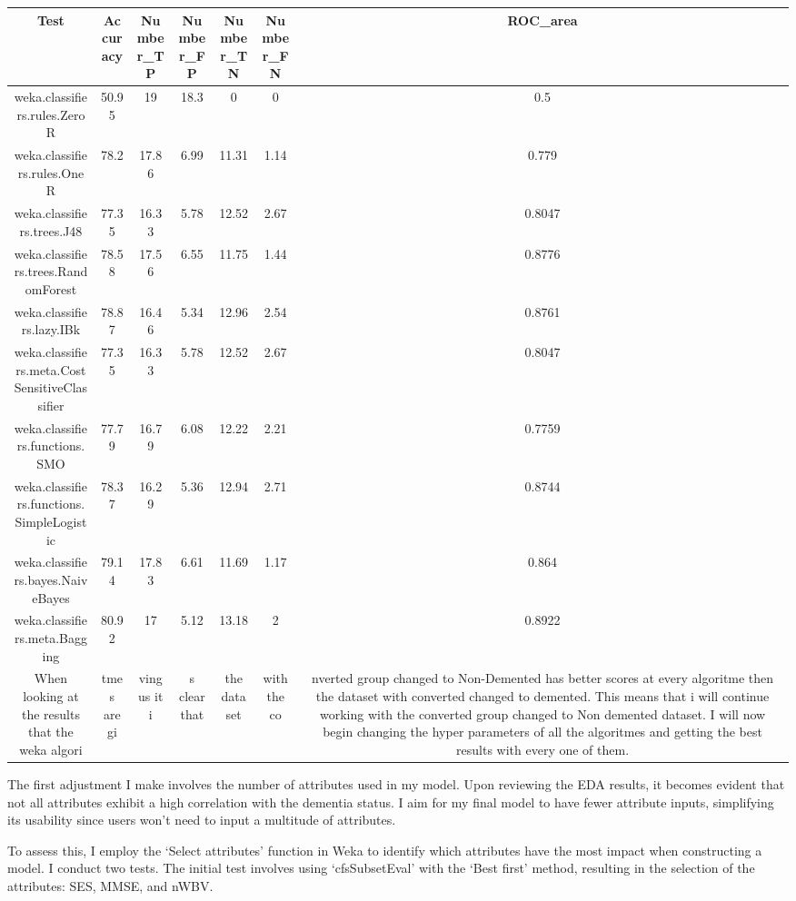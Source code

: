 \documentclass[
]{article}
\begin{document}
\begin{longtable}[]{@{}ccccccc@{}}
\toprule()
Test & Accuracy & Number\_TP & Number\_FP & Number\_TN & Number\_FN &
ROC\_area \\
\midrule()
\endhead
weka.classifiers.rules.ZeroR & 50.95 & 19 & 18.3 & 0 & 0 & 0.5 \\
weka.classifiers.rules.OneR & 78.2 & 17.86 & 6.99 & 11.31 & 1.14 &
0.779 \\
weka.classifiers.trees.J48 & 77.35 & 16.33 & 5.78 & 12.52 & 2.67 &
0.8047 \\
weka.classifiers.trees.RandomForest & 78.58 & 17.56 & 6.55 & 11.75 &
1.44 & 0.8776 \\
weka.classifiers.lazy.IBk & 78.87 & 16.46 & 5.34 & 12.96 & 2.54 &
0.8761 \\
weka.classifiers.meta.CostSensitiveClassifier & 77.35 & 16.33 & 5.78 &
12.52 & 2.67 & 0.8047 \\
weka.classifiers.functions.SMO & 77.79 & 16.79 & 6.08 & 12.22 & 2.21 &
0.7759 \\
weka.classifiers.functions.SimpleLogistic & 78.37 & 16.29 & 5.36 & 12.94
& 2.71 & 0.8744 \\
weka.classifiers.bayes.NaiveBayes & 79.14 & 17.83 & 6.61 & 11.69 & 1.17
& 0.864 \\
weka.classifiers.meta.Bagging & 80.92 & 17 & 5.12 & 13.18 & 2 &
0.8922 \\
When looking at the results that the weka algori & tmes are gi & ving us
it i & s clear that & the dataset & with the co & nverted group changed
to Non-Demented has better scores at every algoritme then the dataset
with converted changed to demented. This means that i will continue
working with the converted group changed to Non demented dataset. I will
now begin changing the hyper parameters of all the algoritmes and
getting the best results with every one of them. \\
\bottomrule()
\end{longtable}

The first adjustment I make involves the number of attributes used in my
model. Upon reviewing the EDA results, it becomes evident that not all
attributes exhibit a high correlation with the dementia status. I aim
for my final model to have fewer attribute inputs, simplifying its
usability since users won't need to input a multitude of attributes.

To assess this, I employ the `Select attributes' function in Weka to
identify which attributes have the most impact when constructing a
model. I conduct two tests. The initial test involves using
`cfsSubsetEval' with the `Best first' method, resulting in the selection
of the attributes: SES, MMSE, and nWBV.
\end{document}
